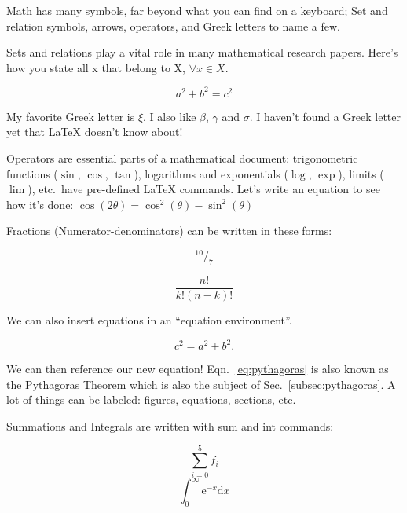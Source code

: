 \documentclass[12pt]{article}
\begin{document}
Math has many symbols, far beyond what you can find on a keyboard;
Set and relation symbols, arrows, operators, and Greek letters to name a few.

Sets and relations play a vital role in many mathematical research papers.
Here's how you state all x that belong to X, $\forall x \in X$.

\[a^2 + b^2 = c^2 \]

My favorite Greek letter is $\xi$. I also like $\beta$, $\gamma$ and $\sigma$.
I haven't found a Greek letter yet that \LaTeX{} doesn't know
about!

Operators are essential parts of a mathematical document:
trigonometric functions ($\sin$, $\cos$, $\tan$),
logarithms and exponentials ($\log$, $\exp$),
limits ($\lim$), etc.\ 
have pre-defined LaTeX commands.
Let's write an equation to see how it's done:
$\cos(2\theta) = \cos^{2}(\theta) - \sin^{2}(\theta)$

Fractions (Numerator-denominators) can be written in these forms:

$$ ^{10}/_{7} $$

$$ \frac{n!}{k!(n - k)!} $$

We can also insert equations in an ``equation environment''.

\begin{equation} %
    c^2 = a^2 + b^2.
    \label{eq:pythagoras} %
\end{equation} %

We can then reference our new equation!
Eqn.~\ref{eq:pythagoras} is also known as the Pythagoras Theorem which is also
the subject of Sec.~\ref{subsec:pythagoras}. A lot of things can be labeled:
figures, equations, sections, etc.

Summations and Integrals are written with sum and int commands:

\begin{equation}
  \sum_{i=0}^{5} f_{i}
\end{equation}
\begin{equation}
  \int_{0}^{\infty} \mathrm{e}^{-x} \mathrm{d}x
\end{equation}
\end{document}
